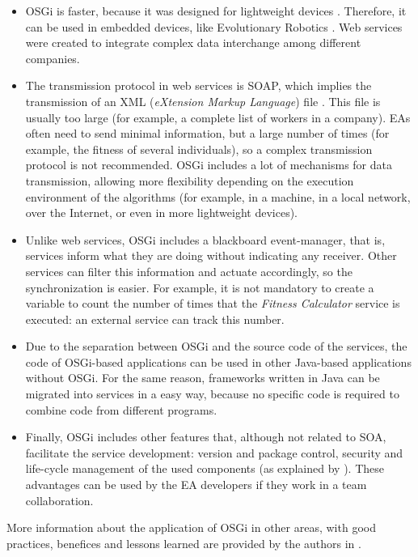 \begin{itemize}

\item OSGi is faster, because it was designed for
  lightweight devices \cite{LimGateway08}. Therefore, it can be
  used in embedded devices, like Evolutionary Robotics
  \cite{Garcia2012testing}. Web services were created to integrate complex
  data interchange among different companies.  
\item The transmission protocol in web services is SOAP, which implies
  the transmission of an XML ({\em eXtension Markup
    Language}) file \cite{XML}. This file is usually too large (for example, a
  complete list of workers in a company). 
 EAs often need to send
  minimal information, but a large number of times (for example, the
  fitness of several individuals), so a complex transmission protocol
  is not recommended. OSGi includes a lot of mechanisms for data
  transmission, allowing more flexibility depending on the execution environment of
  the algorithms (for example, in a machine, in a local
  network, over the Internet, or even in more lightweight devices). 

 \item Unlike web services, OSGi includes a blackboard event-manager,
   that is, services inform what they are doing without indicating 
 any receiver. Other services can filter this information and actuate
 accordingly, so the synchronization is easier. For example, it is not
 mandatory to create a variable to count the number of times that the
 {\em Fitness Calculator} service is executed: an external service can track this number. 
 \item Due to the separation between OSGi and the source code of the
   services, the code of OSGi-based applications can be used in other
   Java-based applications without OSGi. For the same reason,
   frameworks written in Java can be migrated into services in a easy
   way, because no specific code is required to combine code from different programs. 
 \item Finally, OSGi includes other features that, although not related to SOA, facilitate the service development: version and package
   control, security and life-cycle management of the used
   components (as explained by  \cite{WagnerPlugins07}). These advantages can be used by the EA developers if
   they work in a team collaboration. 
\end{itemize}

More information about the application of OSGi in other areas, with good practices, benefices and lessons learned are provided by the authors in \cite{GarciaSanchez2013Gateway}.

